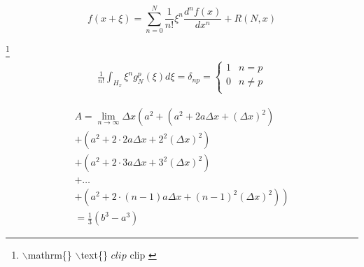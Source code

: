 \documentclass{article}
\begin{document}
    \begin{frame}{ }
	    \begin{exampleblock}{ } %
    		\begin{equation*}
    		f(x+\xi)=\sum_{n=0}^{N}\frac{1}{n!}\xi^n\frac{d^nf(x)}{dx^n}+R(N,x) 
    		\label{equ-1}
    		\end{equation*}
    	\end{exampleblock}
	
    	\begin{exampleblock}{ \footnote{\tiny {  $\backslash$mathrm\{\}   $\backslash$text\{\}   $clip$  $\mathrm{clip}$  }}}
    		\begin{align}
    		    \frac{1}{n!}\int_{H_x}\xi^ng_N^p(\xi)d\xi=\delta_{np}=
    		    \begin{cases}
    			1 & n=p\\
    			0 & n\neq p\\
    		    \end{cases}
    	    	\label{equ-2}
    		\end{align}
    	\end{exampleblock}
    \end{frame}
	
	\begin{frame}
		\begin{exampleblock}{ }
			\begin{multline}
			A=\lim_{n\rightarrow\infty}\Delta x\left(a^{2}+\left(a^{2}+2a\Delta x+\left(\Delta x\right)^{2}\right)\right.\label{eq:reset}\\
			+\left(a^{2}+2\cdot2a\Delta x+2^{2}\left(\Delta x\right)^{2}\right)\\
			+\left(a^{2}+2\cdot3a\Delta x+3^{2}\left(\Delta x\right)^{2}\right)\\
			+\ldots\\
			\left.+\left(a^{2}+2\cdot(n-1)a\Delta x+(n-1)^{2}\left(\Delta x\right)^{2}\right)\right)\\
			=\frac{1}{3}\left(b^{3}-a^{3}\right)
			\end{multline}
		\end{exampleblock}
	\end{frame}
	
\end{document}
